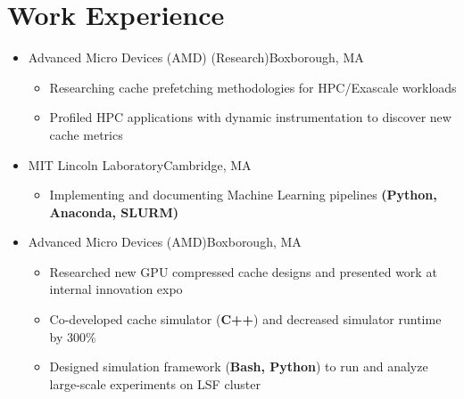 \documentclass[11pt,letterpaper,sans]{moderncv}
\begin{document}
\section{Work Experience}

\vspace{1pt}

\begin{itemize}

\item[] {
{Advanced Micro Devices (AMD) (Research)}{Boxborough, MA}{}{\vspace{1pt}}
\vspace{-8pt}	\begin{itemize}
	 \item Researching cache prefetching methodologies for HPC/Exascale workloads
	 \item Profiled HPC applications with dynamic instrumentation to discover new cache metrics
	\end{itemize}
}
\vspace{6pt}


\item[] {
{MIT Lincoln Laboratory}{Cambridge, MA}{}{\vspace{1pt}}
\vspace{-8pt}	\begin{itemize}
	 \item Implementing and documenting Machine Learning pipelines \textbf{(Python, Anaconda, SLURM)}
	\end{itemize}
}
\vspace{6pt}

\item[] {
{Advanced Micro Devices (AMD)}{Boxborough, MA}{}{\vspace{1pt}}
\vspace{-8pt}	\begin{itemize}
	 \item Researched new GPU compressed cache designs and presented work at internal innovation expo
	 \item Co-developed cache simulator (\textbf{C++}) and decreased simulator runtime by 300\%
	 \item Designed simulation framework (\textbf{Bash, Python}) to run and analyze large-scale experiments on LSF cluster
	\end{itemize}
}
\vspace{6pt}


\end{itemize}
\end{document}
